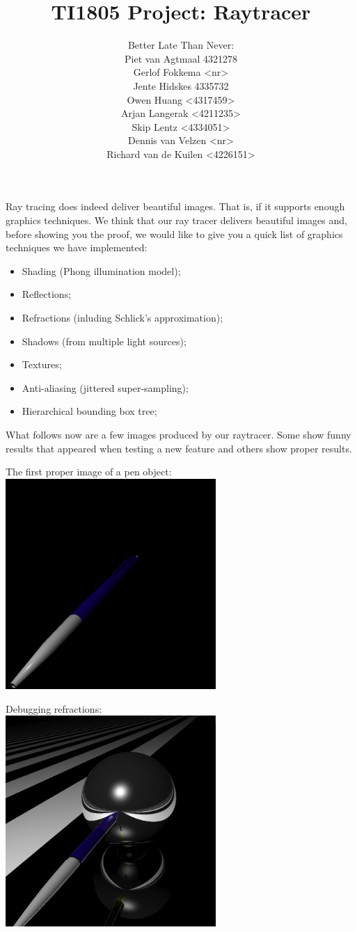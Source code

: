 \documentclass[a4paper,11pt]{article}
\title{TI1805 Project: Raytracer}
\author{Better Late Than Never:\\
		Piet van Agtmaal 4321278\\
		Gerlof Fokkema <nr>\\
		Jente Hidskes 4335732\\
		Owen Huang <4317459>\\
		Arjan Langerak <4211235>\\
		Skip Lentz <4334051>\\
		Dennis van Velzen <nr>\\
		Richard van de Kuilen <4226151>\\
	   }
\begin{document}
\maketitle
Ray tracing does indeed deliver beautiful images. That is, if it supports enough graphics techniques. We think that our ray tracer delivers beautiful images and, before showing you the proof, we would like to give you a quick list of graphics techniques we have implemented:
\begin{itemize}
	\item Shading (Phong illumination model);
	\item Reflections;
	\item Refractions (inluding Schlick's approximation);
	\item Shadows (from multiple light sources);
	\item Textures;
	\item Anti-aliasing (jittered super-sampling);
	\item Hierarchical bounding box tree;
\end{itemize}
What follows now are a few images produced by our raytracer. Some show funny results that appeared when testing a new feature and others show proper results.

\newpage The first proper image of a pen object:\\
\includegraphics[keepaspectratio,width=8.0cm]{images/interpolate_pen}

Debugging refractions:\\
\includegraphics[keepaspectratio,width=8.0cm]{images/master-plane-sphere-pen}\\
\end{document}
